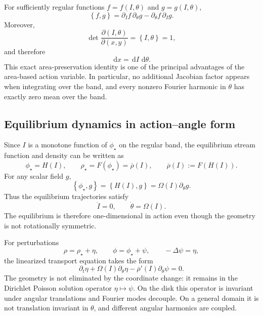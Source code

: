 \documentclass[11pt,a4paper]{article}
\newcommand{\dd}{\,\mathrm{d}}
\newcommand{\bracket}[2]{\left\{#1,#2\right\}}
\begin{document}
For sufficiently regular functions $f=f(I,\theta)$ and $g=g(I,\theta)$,
\begin{equation}
  \bracket{f}{g}
  =\partial_I f\,\partial_\theta g
   -\partial_\theta f\,\partial_I g.
  \label{eq:canonical-bracket}
\end{equation}
Moreover,
\begin{equation}
  \det\frac{\partial(I,\theta)}{\partial(x,y)}
  =\bracket{I}{\theta}=1,
\end{equation}
and therefore
\begin{equation}
  \dd x=\dd I\,\dd\theta.
  \label{eq:canonical-bracket-measure}
\end{equation}
This exact area-preservation identity is one of the principal advantages of the area-based action variable. In particular, no additional Jacobian factor appears when integrating over the band, and every nonzero Fourier harmonic in $\theta$ has exactly zero mean over the band.

\subsection{Equilibrium dynamics in action--angle form}

Since $I$ is a monotone function of $\phi_\star$ on the regular band, the equilibrium stream function and density can be written as
\begin{equation}
  \phi_\star=H(I),
  \qquad
  \rho_\star=F(\phi_\star)=\overline\rho(I),
  \qquad
  \overline\rho(I):=F(H(I)).
  \label{eq:equilibrium-action}
\end{equation}
For any scalar field $g$,
\begin{equation}
  \bracket{\phi_\star}{g}
  =\bracket{H(I)}{g}
  =\Omega(I)\partial_\theta g.
  \label{eq:equilibrium-advection-action-angle}
\end{equation}
Thus the equilibrium trajectories satisfy
\begin{equation}
  \dot I=0,
  \qquad
  \dot\theta=\Omega(I).
  \label{eq:action-angle-trajectories}
\end{equation}
The equilibrium is therefore one-dimensional in action even though the geometry is not rotationally symmetric.

For perturbations
\begin{equation}
  \rho=\rho_\star+\eta,
  \qquad
  \phi=\phi_\star+\psi,
  \qquad
  -\Delta\psi=\eta,
\end{equation}
the linearized transport equation takes the form
\begin{equation}
  \partial_t\eta
  +\Omega(I)\partial_\theta\eta
  -\overline\rho'(I)\partial_\theta\psi
  =0.
  \label{eq:linearized-action-angle-preview}
\end{equation}
The geometry is not eliminated by the coordinate change: it remains in the Dirichlet Poisson solution operator $\eta\mapsto\psi$. On the disk this operator is invariant under angular translations and Fourier modes decouple. On a general domain it is not translation invariant in $\theta$, and different angular harmonics are coupled.
\end{document}
